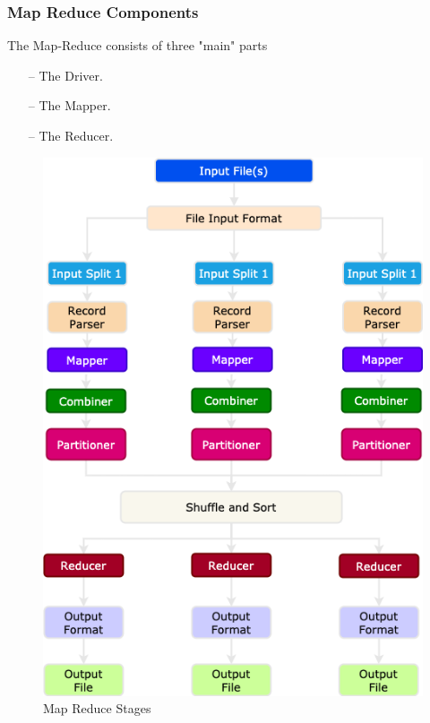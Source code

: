 \begin{frame}[c]{ }
	\frametitle{Map Reduce Components }
	
	The Map-Reduce consists of three "main" parts
	
	\begin{itemize}  [<+->]
		\item [--] The Driver.
		\item [--] The Mapper.
		\item [--] The Reducer.
		
	\end{itemize}
\end{frame}

\begin{frame}
	
	\begin{figure}
		\includegraphics[height=.925\textheight]{./Figures/chapter-02/Map-Reduce.png}
		\caption{Map Reduce Stages } \label{fig:MRSteps}
	\end{figure}			
\end{frame}
